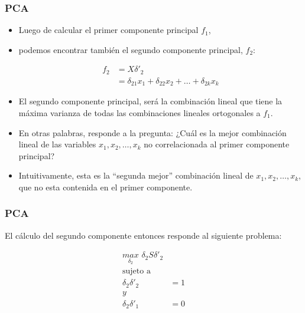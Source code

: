 \documentclass[
  shownotes,
  xcolor={svgnames},
  hyperref={colorlinks,citecolor=DarkBlue,linkcolor=DarkRed,urlcolor=DarkBlue}
  , aspectratio=169]{beamer}
\begin{document}
\begin{frame}
\frametitle{PCA}

\begin{itemize}


\item Luego de calcular el primer componente principal \(f_1\), 
\medskip
\item podemos encontrar también el segundo componente principal, \(f_2\):

\begin{align}
f_2 &= X \delta'_2 \\ 
    &= \delta_{21} x_1+ \delta_{22} x_2 + \dots + \delta_{2k} x_k
\end{align}

\item El segundo componente principal, será la combinación lineal que tiene la máxima varianza de todas las combinaciones lineales ortogonales a
\(f_1\).
\medskip
\item En otras palabras, responde a la pregunta: ¿Cuál es la mejor combinación lineal de las variables \(x_1,x_2,\dots,x_k\) no correlacionada al primer componente principal? 
\medskip
\item Intuitivamente, esta es la ``segunda mejor'' combinación lineal de \(x_1,x_2,\dots,x_k\), que no esta contenida en el primer componente.
\end{itemize}
\end{frame}
\begin{frame}
\frametitle{PCA}

El cálculo del segundo componente entonces responde al siguiente
problema:

\begin{align}
\underset{\delta_2}{max}\,\, \delta_2 S \delta'_2 \\
\text{sujeto a}   \\
\delta_2 \delta'_2 &= 1   \\
y \\ 
\delta_2 \delta'_1 &=0 \\ \nonumber
\end{align}

\end{frame}
\end{document}
